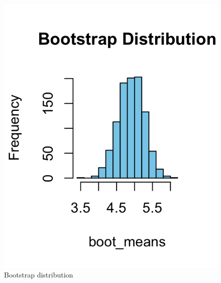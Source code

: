 \documentclass[aodsor,preprint]{imsart}
\numberwithin{equation}{section}
\theoremstyle{plain}
\begin{document}
\begin{figure}[H]
\centering
\begin{minipage}[b]{0.45\textwidth}
  \centering
  \includegraphics[width=\textwidth]{Rplot02.png}
  \caption{Bootstrap distribution}
  \label{fig:bootstrap-dist}
\end{minipage}
\hfill
\begin{minipage}[b]{0.45\textwidth}
  \centering

\end{minipage}
\end{figure}
\end{document}
